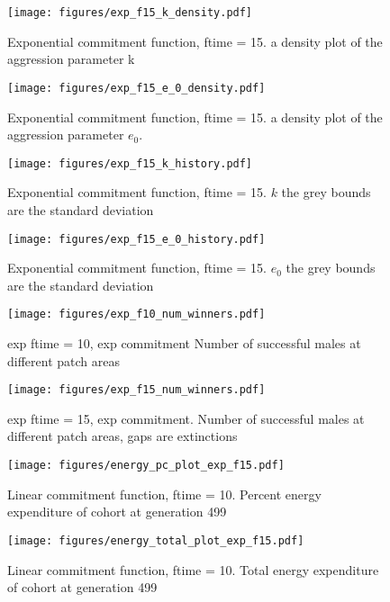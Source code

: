 \documentclass[a4paper,11pt]{article}
\begin{document}
\begin{figure}[h!]
    \centering
    \texttt{[image: figures/exp\_f15\_k\_density.pdf]}
    \caption{Exponential commitment function, ftime = 15. a density plot of the aggression parameter k}
    \label{fig:k density}

    \texttt{[image: figures/exp\_f15\_e\_0\_density.pdf]}
    \caption{Exponential commitment function, ftime = 15. a density plot of the aggression parameter $e_0$.}
    \label{fig:e_0 density}
\end{figure}

\begin{figure}[h!]
    \centering
    \texttt{[image: figures/exp\_f15\_k\_history.pdf]}
    \caption{Exponential commitment function, ftime = 15. $k$ the grey bounds are the standard deviation}

    \texttt{[image: figures/exp\_f15\_e\_0\_history.pdf]}
    \caption{Exponential commitment function, ftime = 15. $e_0$ the grey bounds are the standard deviation}
\end{figure}



\begin{figure}[h!]
    \centering
    \texttt{[image: figures/exp\_f10\_num\_winners.pdf]}
    \caption{exp ftime = 10, exp commitment Number of successful males at different patch areas}
    \label{fig:num winners expf10}

    \texttt{[image: figures/exp\_f15\_num\_winners.pdf]}
    \caption{exp ftime = 15, exp commitment. Number of successful males at different patch areas, gaps are extinctions}
    \label{fig:num winners}
\end{figure}


\begin{figure}[h!]
    \centering
    \texttt{[image: figures/energy\_pc\_plot\_exp\_f15.pdf]}
    \caption{Linear commitment function, ftime = 10. Percent energy expenditure of cohort at generation 499}
    \label{fig:var energy pc}
    \centering

    \texttt{[image: figures/energy\_total\_plot\_exp\_f15.pdf]}
    \caption{Linear commitment function, ftime = 10. Total energy expenditure of cohort at generation 499}
    \label{fig:var energy total}
\end{figure}
\end{document}
